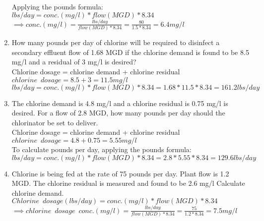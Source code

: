 \begin{enumerate}
Applying the pounds formula:\\  $lbs/day=conc. (mg/l)*flow(MGD)*8.34$\\
\vspace{0.25cm}
$\implies conc. (mg/l)=\frac{lbs/day}{flow(MGD)*8.34}=\frac{80}{1.5*8.34}=\boxed{6.4mg/l}$
\vspace{0.25cm}
\item How many pounds per day of chlorine will be required to disinfect a secondary effluent flow of 1.68 MGD if the chlorine demand is found to be 8.5 mg/l and a residual of 3 mg/l is desired?\\
\vspace{0.25cm}
Chlorine dosage = chlorine demand + chlorine residual\\
\vspace{0.25cm}
$chlorine \enspace dosage=8.5+3=11.5mg/l$\\
$lbs/day=conc. (mg/l)*flow(MGD)*8.34=1.68*11.5*8.34=\boxed{161.2lbs/day}$\\
\vspace{0.25cm}
\item The chlorine demand is 4.8 mg/l and a chlorine residual is 0.75 mg/l is desired. For a flow of 2.8 MGD, how many pounds per day should the chlorinator be set to deliver.\\
\vspace{0.25cm}
Chlorine dosage = chlorine demand + chlorine residual\\
\vspace{0.25cm}
$chlorine \enspace dosage=4.8+0.75=5.55mg/l$\\
\vspace{0.25cm}
To calculate pounds per day, applying the pounds formula:\\ 
\vspace{0.25cm}
$lbs/day=conc. (mg/l)*flow(MGD)*8.34=2.8*5.55*8.34=\boxed{129.6lbs/day}$\\
\vspace{0.25cm}
\item Chlorine is being fed at the rate of 75 pounds per day. Plant flow is 1.2 MGD. The chlorine residual is measured and found to be 2.6 mg/l Calculate chlorine demand.\\
\vspace{0.25cm}
$Chlorine \enspace dosage (lbs/day)=conc. (mg/l)*flow(MGD)*8.34$\\
\vspace{0.25cm}
$\implies chlorine \enspace dosage \enspace conc. (mg/l)=\frac{lbs/day}{flow(MGD)*8.34}=\frac{75}{1.2*8.34}=7.5mg/l$\\

\end{enumerate}
